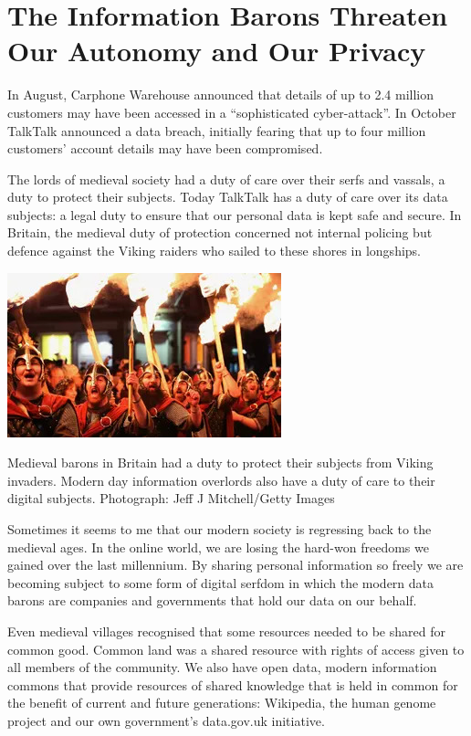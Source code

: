 \documentclass[a4paper]{caesar_book}
\let\oldchapter\chapter
\def\chapter{%
  \setcounter{footnote}{0}%
  \oldchapter
}
\begin{document}
\chapter{The Information Barons Threaten\\Our Autonomy and Our Privacy}

In August, Carphone Warehouse announced that details of up to 2.4 million customers may have been accessed in a ``sophisticated cyber-attack''. In October TalkTalk announced a data breach, initially fearing that up to four million customers’ account details may have been compromised.

The lords of medieval society had a duty of care over their serfs and vassals, a duty to protect their subjects. Today TalkTalk has a duty of care over its data subjects: a legal duty to ensure that our personal data is kept safe and secure. In Britain, the medieval duty of protection concerned not internal policing but defence against the Viking raiders who sailed to these shores in longships.

\begin{marginfigure}%
    \includegraphics[width=\marginparwidth]{pictures/vikings.jpeg}%
    \caption*{Medieval barons in Britain had a duty to protect their subjects from Viking invaders. Modern day information overlords also have a duty of care to their digital subjects. Photograph: Jeff J Mitchell/Getty Images\label{vikings}}%
\end{marginfigure}%

Sometimes it seems to me that our modern society is regressing back to the medieval ages. In the online world, we are losing the hard-won freedoms we gained over the last millennium. By sharing personal information so freely we are becoming subject to some form of digital serfdom in which the modern data barons are companies and governments that hold our data on our behalf.

Even medieval villages recognised that some resources needed to be shared for common good. Common land was a shared resource with rights of access given to all members of the community. We also have open data, modern information commons that provide resources of shared knowledge that is held in common for the benefit of current and future generations: Wikipedia, the human genome project and our own government’s data.gov.uk initiative.
\end{document}
